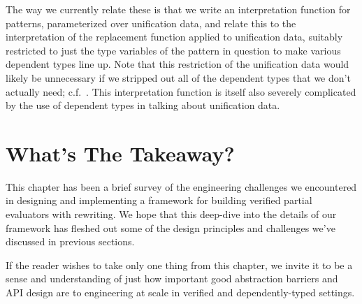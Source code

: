 The way we currently relate these is that we write an interpretation function for patterns, parameterized over unification data, and relate this to the interpretation of the replacement function applied to unification data, suitably restricted to just the type variables of the pattern in question to make various dependent types line up.
Note that this restriction of the unification data would likely be unnecessary if we stripped out all of the dependent types that we don't actually need; c.f.~.
This interpretation function is itself also severely complicated by the use of dependent types in talking about unification data.

\section{What's The Takeaway?}
This chapter has been a brief survey of the engineering challenges we encountered in designing and implementing a framework for building verified partial evaluators with rewriting.
We hope that this deep-dive into the details of our framework has fleshed out some of the design principles and challenges we've discussed in previous sections.

If the reader wishes to take only one thing from this chapter, we invite it to be a sense and understanding of just how important good abstraction barriers and API design are to engineering at scale in verified and dependently-typed settings.

\begin{comment}
\clearpage

\todo{mention frowned-upon Perl scripts previously in BoringSSL(?) OpenSSL?; (ask Andres for reference?)} Perl scripts were complicated, a number of steps removed from actual running code, hard to maintain and verify.
\todo{Refer back to representation changes (good abstraction barriers / equivalences) being important in fiat-crypto, and being cheap only because we have a rewriter}
\setlistdepth{20}
\renewlist{itemize}{itemize}{20}%
\setlist[itemize,1]{label=\textbullet}%
\setlist[itemize,2]{label=\normalfont \bfseries \textendash}%
\setlist[itemize,3]{label=\textasteriskcentered}%
\setlist[itemize,4]{label=\textperiodcentered}%
\setlist[itemize,5]{label=\textbullet}%
\setlist[itemize,6]{label=\normalfont \bfseries \textendash}%
\setlist[itemize,7]{label=\textasteriskcentered}%
\setlist[itemize,8]{label=\textperiodcentered}%
\setlist[itemize,9]{label=\textbullet}%
\setlist[itemize,10]{label=\normalfont \bfseries \textendash}%
\setlist[itemize,11]{label=\textasteriskcentered}%
\setlist[itemize,12]{label=\textperiodcentered}%
\setlist[itemize,13]{label=\textbullet}%
\setlist[itemize,14]{label=\normalfont \bfseries \textendash}%
\setlist[itemize,15]{label=\textasteriskcentered}%
\setlist[itemize,16]{label=\textperiodcentered}%
\setlist[itemize,17]{label=\textbullet}%
\setlist[itemize,18]{label=\normalfont \bfseries \textendash}%
\setlist[itemize,19]{label=\textasteriskcentered}%
\setlist[itemize,20]{label=\textperiodcentered}%


\end{comment}
%
